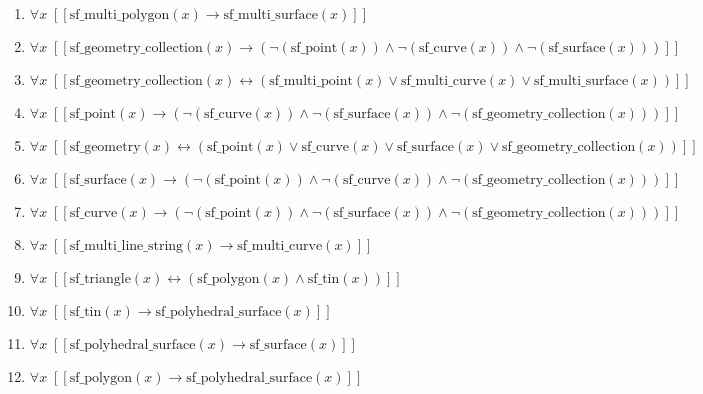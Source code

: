 \documentclass{article}
\begin{document}
\begin{enumerate}
\item $\forall x\;  \left[ \left[ \textrm{sf\_multi\_polygon}(x) \rightarrow \textrm{sf\_multi\_surface}(x) \right] \right]$
\item $\forall x\;  \left[ \left[ \textrm{sf\_geometry\_collection}(x) \rightarrow \left(\neg \left(\textrm{sf\_point}(x)\right) \land \neg \left(\textrm{sf\_curve}(x)\right) \land \neg \left(\textrm{sf\_surface}(x)\right)\right) \right] \right]$
\item $\forall x\;  \left[ \left[ \textrm{sf\_geometry\_collection}(x) \leftrightarrow \left(\textrm{sf\_multi\_point}(x) \lor \textrm{sf\_multi\_curve}(x) \lor \textrm{sf\_multi\_surface}(x)\right) \right] \right]$
\item $\forall x\;  \left[ \left[ \textrm{sf\_point}(x) \rightarrow \left(\neg \left(\textrm{sf\_curve}(x)\right) \land \neg \left(\textrm{sf\_surface}(x)\right) \land \neg \left(\textrm{sf\_geometry\_collection}(x)\right)\right) \right] \right]$
\item $\forall x\;  \left[ \left[ \textrm{sf\_geometry}(x) \leftrightarrow \left(\textrm{sf\_point}(x) \lor \textrm{sf\_curve}(x) \lor \textrm{sf\_surface}(x) \lor \textrm{sf\_geometry\_collection}(x)\right) \right] \right]$
\item $\forall x\;  \left[ \left[ \textrm{sf\_surface}(x) \rightarrow \left(\neg \left(\textrm{sf\_point}(x)\right) \land \neg \left(\textrm{sf\_curve}(x)\right) \land \neg \left(\textrm{sf\_geometry\_collection}(x)\right)\right) \right] \right]$
\item $\forall x\;  \left[ \left[ \textrm{sf\_curve}(x) \rightarrow \left(\neg \left(\textrm{sf\_point}(x)\right) \land \neg \left(\textrm{sf\_surface}(x)\right) \land \neg \left(\textrm{sf\_geometry\_collection}(x)\right)\right) \right] \right]$
\item $\forall x\;  \left[ \left[ \textrm{sf\_multi\_line\_string}(x) \rightarrow \textrm{sf\_multi\_curve}(x) \right] \right]$
\item $\forall x\;  \left[ \left[ \textrm{sf\_triangle}(x) \leftrightarrow \left(\textrm{sf\_polygon}(x) \land \textrm{sf\_tin}(x)\right) \right] \right]$
\item $\forall x\;  \left[ \left[ \textrm{sf\_tin}(x) \rightarrow \textrm{sf\_polyhedral\_surface}(x) \right] \right]$
\item $\forall x\;  \left[ \left[ \textrm{sf\_polyhedral\_surface}(x) \rightarrow \textrm{sf\_surface}(x) \right] \right]$
\item $\forall x\;  \left[ \left[ \textrm{sf\_polygon}(x) \rightarrow \textrm{sf\_polyhedral\_surface}(x) \right] \right]$

\end{enumerate}
\end{document}
